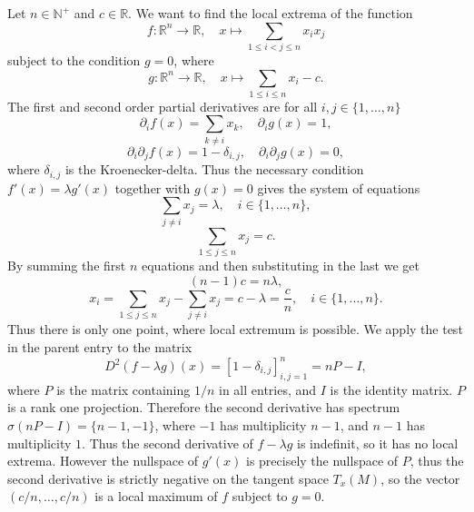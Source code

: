 \documentclass[12pt]{article}
\begin{document}
Let $n\in\mathbb{N}^+$ and $c\in\mathbb{R}$. We want to find the local extrema of the function
\[f\colon\mathbb{R}^n\to\mathbb{R},\quad x\mapsto\sum_{1\le i<j\le n}x_ix_j\]
subject to the condition $g=0$, where
\[g\colon\mathbb{R}^n\to\mathbb{R},\quad x\mapsto\sum_{1\le i\le n}x_i-c.\]
The first and second order partial derivatives are for all $i,j\in\{1,\dots,n\}$
\[\partial_if(x)=\sum_{k\neq i}x_k,\quad\partial_ig(x)=1,\]
\[\partial_i\partial_jf(x)=1-\delta_{i,j},\quad\partial_i\partial_jg(x)=0,\]
where $\delta_{i,j}$ is the Kroenecker-delta. Thus the necessary condition $f'(x)=\lambda g'(x)$ together with $g(x)=0$ gives the system of equations
\[\sum_{j\neq i}x_j=\lambda,\quad i\in\{1,\dots,n\},\]
\[\sum_{1\le j\le n}x_j=c.\]
By summing the first $n$ equations and then substituting in the last we get
\[(n-1)c=n\lambda,\]
\[x_i=\sum_{1\le j\le n}x_j-\sum_{j\neq i}x_j=c-\lambda=\frac{c}{n},\quad i\in\{1,\dots,n\}.\]
Thus there is only one point, where local extremum is possible. We apply the test in the parent entry to the matrix
\[D^2(f-\lambda g)(x)=[1-\delta_{i,j}]_{i,j=1}^n=nP-I,\]
where $P$ is the matrix containing $1/n$ in all entries, and $I$ is the identity matrix. $P$ is a rank one projection. Therefore the second derivative has spectrum $\sigma(nP-I)=\{n-1,-1\}$, where $-1$ has multiplicity $n-1$, and $n-1$ has multiplicity $1$. Thus the second derivative of $f-\lambda g$ is indefinit, so it has no local extrema. However the nullspace of $g'(x)$ is precisely the nullspace of $P$, thus the second derivative is strictly negative on the tangent space $T_x(M)$, so the vector $(c/n,\dots,c/n)$ is a local maximum of $f$ subject to $g=0$.
\end{document}
